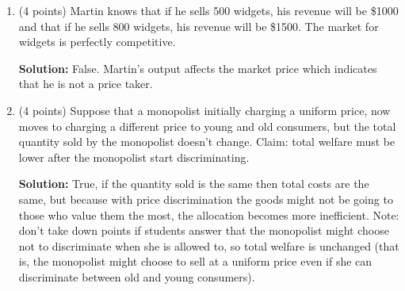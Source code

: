 \documentclass{article}
\begin{document}
\begin{enumerate}
\item (4 points) Martin knows that if he sells 500 widgets, his revenue will be \$1000 and that if he sells 800 widgets, his revenue will be \$1500. The market for widgets is perfectly competitive.

\textbf{Solution:} False. Martin’s output affects the market price which indicates that he is not a price taker.

\item (4 points) Suppose that a monopolist initially charging a uniform price, now moves to charging a different price to young and old consumers, but the total quantity sold by the monopolist doesn’t change. Claim: total welfare must be lower after the monopolist start discriminating.

\textbf{Solution:} True, if the quantity sold is the same then total costs are the same, but because with price discrimination the goods might not be going to those who value them the most, the allocation becomes more inefficient. Note: don’t take down points if students answer that the monopolist might choose not to discriminate when she is allowed to, so total welfare is unchanged (that is, the monopolist  might choose to sell at a uniform price even if she can discriminate between old and young consumers).
\end{enumerate}
\end{document}
